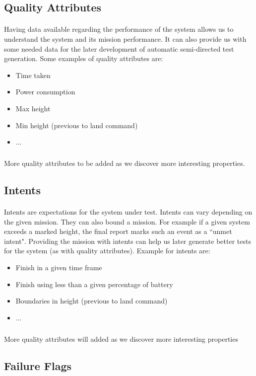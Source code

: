 \documentclass[12pt, a4paper]{article}
\begin{document}
\subsection{Quality Attributes}
\paragraph{}
Having data available regarding the performance of the system allows us to understand the system and its mission performance. It can also provide us with some needed data for the later development of automatic semi-directed test generation. Some examples of quality attributes are:
\begin{itemize}
\itemsep-.5em
\item Time taken
\item Power consumption 
\item Max height 
\item Min height (previous to land command)
\item ...		
\end{itemize}
	
\subparagraph{}
More quality attributes to be added as we discover more interesting properties.
	
\subsection{Intents}
\paragraph{}
Intents are expectations for the system under test. Intents can vary depending on the given mission. They can also bound a mission. For example if a given system exceeds a marked height, the final report marks such an event as a ``unmet intent". Providing the mission with intents can help us later generate better tests for the system (as with quality attributes). Example for intents are:
\begin{itemize}
\itemsep-.5em
\item Finish in a given time frame
\item Finish using less than a given percentage of battery  
\item Boundaries in height (previous to land command)
\item ...		
\end{itemize}
\subparagraph{}
More quality attributes will added as we discover more interesting properties
	
\subsection{Failure Flags}
\end{document}
